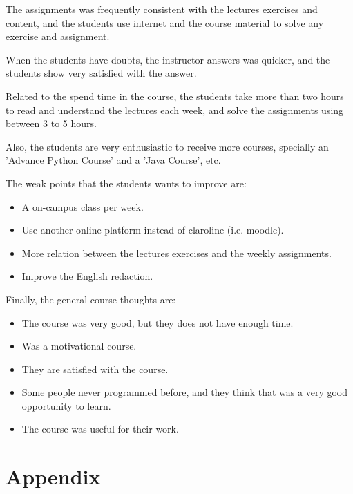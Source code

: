 \documentclass[letter, 10pt]{article}
\begin{document}
The assignments was frequently consistent with the lectures exercises
and content, and the students use internet and the course material
to solve any exercise and assignment.

When the students have doubts, the instructor answers was quicker,
and the students show very satisfied with the answer.

Related to the spend time in the course,
the students take more than two hours to read and understand the lectures
each week, and solve the assignments using between 3 to 5 hours.

Also, the students are very enthusiastic to receive more courses,
specially an 'Advance Python Course' and a 'Java Course', etc.

The weak points that the students wants to improve are:
\begin{itemize}
    \item A on-campus class per week.
    \item Use another online platform instead of claroline (i.e. moodle).
    \item More relation between the lectures exercises and the weekly assignments.
    \item Improve the English redaction.
\end{itemize}


Finally, the general course thoughts are:

\begin{itemize}
    \item The course was very good, but they does not have enough time.
    \item Was a motivational course.
    \item They are satisfied with the course.
    \item Some people never programmed before, and they think that was a very good opportunity to learn.
    \item The course was useful for their work.
\end{itemize}

\newpage
\section{Appendix}
\end{document}
